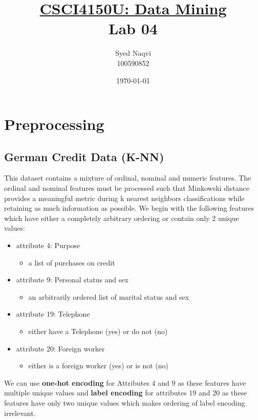 \documentclass{article}
\title{\textbf{\underline{CSCI4150U: Data Mining}\\Lab 04}}
\author{Syed Naqvi\\100590852}
\date{\today}
\begin{document}
    \maketitle

    \section{Preprocessing}
    \subsection*{German Credit Data (K-NN)}
    
    This dataset contains a mixture of ordinal, nominal and numeric features. The ordinal and nominal
    features must be processed such that Minkowski distance provides a meaningful metric
    during k nearest neighbors classifications while retaining as much information as possible.
    We begin with the following features which have either a completely arbitrary ordering or
    contain only 2 unique values:

    \begin{itemize}
        \item attribute 4: Purpose
        \begin{itemize}
            \item a list of purchases on credit
        \end{itemize}
        \item attribute 9: Personal status and sex
        \begin{itemize}
            \item an arbitrarily ordered list of marital status and sex
        \end{itemize}
        \item attribute 19: Telephone
        \begin{itemize}
            \item either have a Telephone (yes) or do not (no)
        \end{itemize}
        \item attribute 20: Foreign worker
        \begin{itemize}
            \item either is a foreign worker (yes) or is not (no)
        \end{itemize}
    \end{itemize}
    
    \newpage

    We can use \textbf{one-hot encoding} for Attributes 4 and 9 as these features have multiple
    unique values and \textbf{label encoding} for attributes 19 and 20 as these features have
    only two unique values which makes ordering of label encoding irrelevant.
\end{document}
